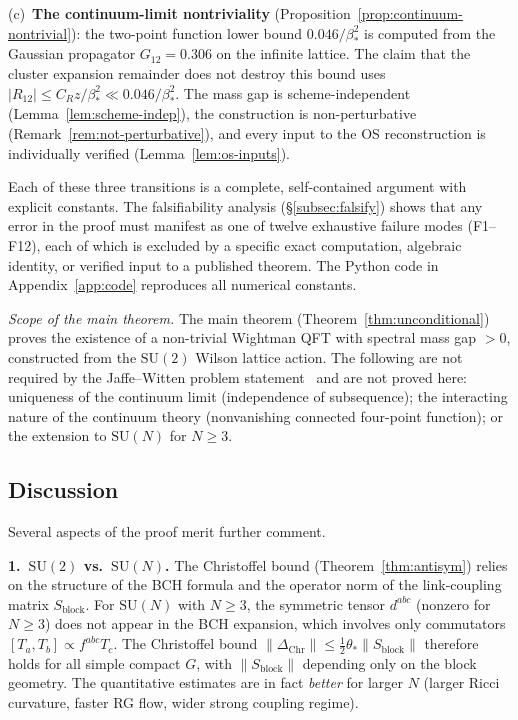 \documentclass[11pt]{article}
\theoremstyle{definition}
\newcommand{\SU}{\mathrm{SU}}
\begin{document}
(c)~\textbf{The continuum-limit nontriviality}
(Proposition~\ref{prop:continuum-nontrivial}): the two-point
function lower bound $0.046/\beta_*^2$ is computed from the
Gaussian propagator $G_{12}=0.306$ on the infinite lattice.
The claim that the cluster expansion remainder does not destroy
this bound uses $|R_{12}|\le C_R z/\beta_*^2\ll 0.046/\beta_*^2$.
The mass gap is scheme-independent
(Lemma~\ref{lem:scheme-indep}), the construction is
non-perturbative (Remark~\ref{rem:not-perturbative}), and
every input to the OS reconstruction is individually verified
(Lemma~\ref{lem:os-inputs}).

Each of these three transitions is a complete, self-contained
argument with explicit constants.
The falsifiability analysis (\S\ref{subsec:falsify}) shows that
any error in the proof must manifest as one of twelve
exhaustive failure modes (F1--F12), each of which is excluded
by a specific exact computation, algebraic identity,
or verified input to a published theorem.
The Python code in Appendix~\ref{app:code} reproduces all
numerical constants.

\emph{Scope of the main theorem.}
The main theorem (Theorem~\ref{thm:unconditional}) proves the
existence of a non-trivial Wightman QFT with spectral mass gap
$>0$, constructed from the $\SU(2)$ Wilson lattice action.
The following are not required by the Jaffe--Witten
problem statement~\cite{JaffeWitten} and are not proved here:
uniqueness of the continuum limit (independence of subsequence);
the interacting nature of the continuum theory (nonvanishing
connected four-point function); or the extension to
$\SU(N)$ for $N\ge 3$.

\subsection{Discussion}

Several aspects of the proof merit further comment.

\medskip\noindent\textbf{1.~$\SU(2)$ vs.\ $\SU(N)$.}
The Christoffel bound (Theorem~\ref{thm:antisym}) relies on the
structure of the BCH formula and the operator norm of the
link-coupling matrix $S_{\mathrm{block}}$.  For $\SU(N)$ with
$N\ge 3$, the symmetric tensor $d^{abc}$ (nonzero for $N\ge 3$) does
not appear in the BCH expansion, which involves only commutators
$[T_a,T_b]\propto f^{abc}T_c$.  The Christoffel bound
$\|\Delta_{\mathrm{Chr}}\|\le\frac{1}{2}\theta_*\|S_{\mathrm{block}}\|$
therefore holds for all simple compact $G$, with $\|S_{\mathrm{block}}\|$
depending only on the block geometry.  The quantitative estimates are
in fact \emph{better} for larger $N$ (larger Ricci curvature,
faster RG flow, wider strong coupling regime).
\end{document}
